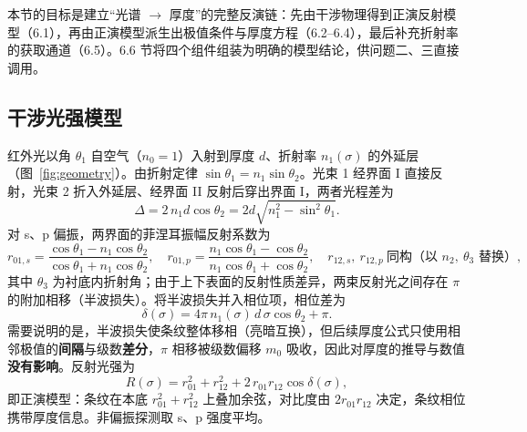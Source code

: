 \documentclass[11pt,a4paper,fontset=fandol]{ctexart}
\begin{document}
本节的目标是建立``光谱 $\to$ 厚度''的完整反演链：先由干涉物理得到正演反射模型（6.1），再由正演模型派生出极值条件与厚度方程（6.2--6.4），最后补充折射率的获取通道（6.5）。6.6 节将四个组件组装为明确的模型结论，供问题二、三直接调用。

\subsection{干涉光强模型}

红外光以角 $\theta_1$ 自空气（$n_0=1$）入射到厚度 $d$、折射率 $n_1(\sigma)$ 的外延层（图~\ref{fig:geometry}）。由折射定律 $\sin\theta_1=n_1\sin\theta_2$。光束 1 经界面 I 直接反射，光束 2 折入外延层、经界面 II 反射后穿出界面 I，两者光程差为
\begin{equation}
    \Delta = 2\,n_1 d\cos\theta_2 = 2d\sqrt{n_1^2-\sin^2\theta_1}.
    \label{eq:opd}
\end{equation}
对 s、p 偏振，两界面的菲涅耳振幅反射系数为
\begin{equation}
    r_{01,s}=\frac{\cos\theta_1-n_1\cos\theta_2}{\cos\theta_1+n_1\cos\theta_2},\quad
    r_{01,p}=\frac{n_1\cos\theta_1-\cos\theta_2}{n_1\cos\theta_1+\cos\theta_2},\quad
    r_{12,s},\ r_{12,p}\ \text{同构（以 } n_2,\ \theta_3 \text{ 替换）},
    \label{eq:fresnel}
\end{equation}
其中 $\theta_3$ 为衬底内折射角；由于上下表面的反射性质差异，两束反射光之间存在 $\pi$ 的附加相移（半波损失）。将半波损失并入相位项，相位差为
\begin{equation}
    \delta(\sigma) = 4\pi\, n_1(\sigma)\, d\,\sigma\cos\theta_2 + \pi .
    \label{eq:phase}
\end{equation}
需要说明的是，半波损失使条纹整体移相（亮暗互换），但后续厚度公式只使用相邻极值的\textbf{间隔}与级数\textbf{差分}，$\pi$ 相移被级数偏移 $m_0$ 吸收，因此对厚度的推导与数值\textbf{没有影响}\cite{xue2026,you2003}。反射光强为
\begin{equation}
    R(\sigma) = r_{01}^2 + r_{12}^2 + 2\,r_{01}r_{12}\cos\delta(\sigma),
    \label{eq:intensity}
\end{equation}
即正演模型：条纹在本底 $r_{01}^2+r_{12}^2$ 上叠加余弦，对比度由 $2r_{01}r_{12}$ 决定，条纹相位携带厚度信息。非偏振探测取 s、p 强度平均。
\end{document}
